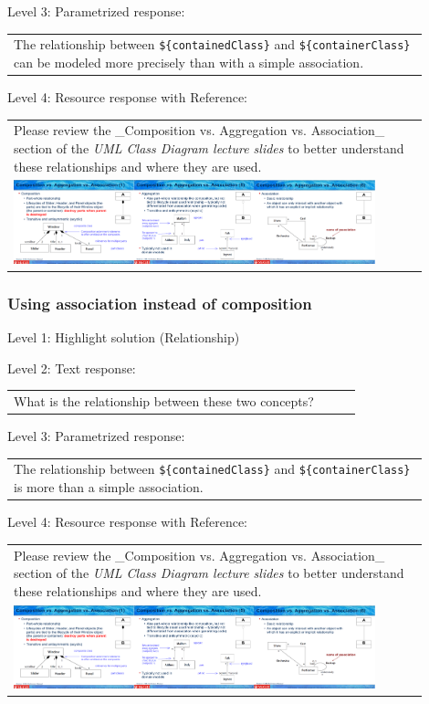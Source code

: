 \noindent Level 3: Parametrized response: \medskip

\begin{tabular}{|p{0.9\linewidth}}
The relationship between \verb|${containedClass}| and \verb|${containerClass}| can be modeled more precisely than with a simple association.
\end{tabular} \medskip

\noindent Level 4: Resource response with Reference: \medskip

\begin{tabular}{|p{0.9\linewidth}}
Please review the _Composition vs. Aggregation vs. Association_ section of 
the \textit{UML Class Diagram lecture slides} to 
better understand these relationships and where they are used.

\\
\includegraphics[width=0.9\textwidth]{images/composition_aggregation_association.png}
\end{tabular} \medskip


\subsubsection{Using association instead of composition}

\noindent Level 1: Highlight solution (Relationship) \medskip

\noindent Level 2: Text response: \medskip

\begin{tabular}{|p{0.9\linewidth}}
What is the relationship between these two concepts?
\end{tabular} \medskip

\noindent Level 3: Parametrized response: \medskip

\begin{tabular}{|p{0.9\linewidth}}
The relationship between \verb|${containedClass}| and \verb|${containerClass}| is more than a simple association.
\end{tabular} \medskip

\noindent Level 4: Resource response with Reference: \medskip

\begin{tabular}{|p{0.9\linewidth}}
Please review the _Composition vs. Aggregation vs. Association_ section of 
the \textit{UML Class Diagram lecture slides} to 
better understand these relationships and where they are used.

\\
\includegraphics[width=0.9\textwidth]{images/composition_aggregation_association.png}
\end{tabular} \medskip


